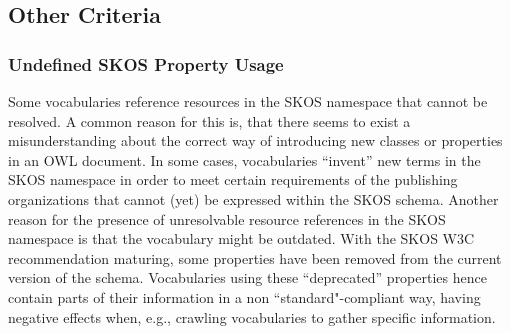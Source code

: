 
\subsection{Other Criteria}

\subsubsection{Undefined SKOS Property Usage}
Some vocabularies reference resources in the SKOS namespace that cannot be resolved. A common reason for this is, that there seems to exist a misunderstanding about the correct way of introducing new classes or properties in an OWL document. In some cases, vocabularies ``invent'' new terms in the SKOS namespace in order to meet certain requirements of the publishing organizations that cannot (yet) be expressed within the SKOS schema. Another reason for the presence of unresolvable resource references in the SKOS namespace is that the vocabulary might be outdated. With the SKOS W3C recommendation maturing, some properties have been removed from the current version of the schema. Vocabularies using these ``deprecated'' properties hence contain parts of their information in a non ``standard"-compliant way, having negative effects when, e.g., crawling vocabularies to gather specific information.

